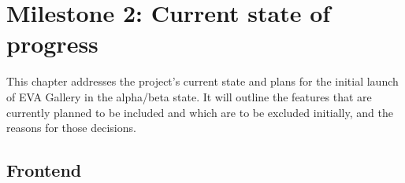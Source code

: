



\chapter{Milestone 2: Current state of progress}
This chapter addresses the project's current state and plans for the initial launch of EVA Gallery in the alpha/beta state. It will outline the features that are currently planned to be included and which are to be excluded initially, and the reasons for those decisions.
\section{Frontend}

